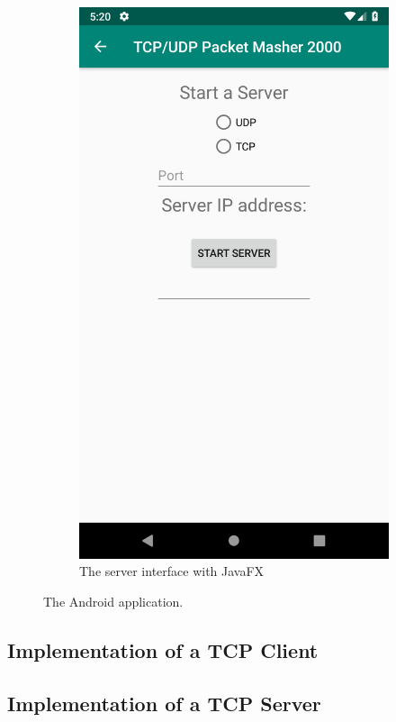 \begin{figure}[H]
\begin{subfigure}{.49\textwidth}
		\includegraphics[width=0.9\linewidth]{images/task1/serverAndroid.png}
		\caption{The server interface with JavaFX}
		\label{fig:serverAndroid}
	\end{subfigure}
	\caption{The Android application.}
	\label{fig:test}
\end{figure}


\subsection{Implementation of a TCP Client}



\subsection{Implementation of a TCP Server}
